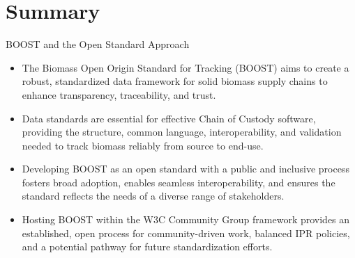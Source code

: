 \documentclass[presentation]{beamer}
\begin{document}
\section{Summary}
\label{summary-boost-and-the-open-standard-approach}
\begin{frame}[label={sec:org9377832}]{BOOST and the Open Standard Approach}
\begin{itemize}
\item The \alert{Biomass Open Origin Standard for Tracking (BOOST)} aims to create a robust, standardized data framework for solid biomass supply chains to enhance transparency, traceability, and trust.
\item \alert{Data standards are essential} for effective Chain of Custody software, providing the structure, common language, interoperability, and validation needed to track biomass reliably from source to end-use.
\item Developing BOOST as an \alert{open standard} with a public and inclusive process fosters broad adoption, enables seamless interoperability, and ensures the standard reflects the needs of a diverse range of stakeholders.
\item Hosting BOOST within the \alert{W3C Community Group} framework provides an established, open process for community-driven work, balanced IPR policies, and a potential pathway for future standardization efforts.
\end{itemize}
\end{frame}
\end{document}
